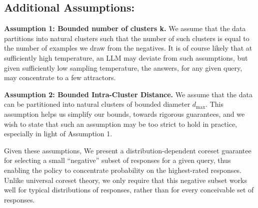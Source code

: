 


\noindent
\subsection{Additional Assumptions:}
\textbf{Assumption 1: Bounded number of clusters k.}  
We assume that the data partitions into natural clusters such that the number of such clusters is equal to the number of examples we draw from the negatives. It is of course likely that at sufficiently high temperature, an LLM may deviate from such assumptions, but given sufficiently low sampling temperature, the answers, for any given query, may concentrate to a few attractors.

\textbf{Assumption 2: Bounded Intra-Cluster Distance.}  
We assume that the data can be partitioned into natural clusters of bounded diameter \(d_{\max}\). This assumption helps us simplify our bounds, towards rigorous guarantees, and we wish to state that such an assumption may be too strict to hold in practice, especially in light of Assumption 1.




Given these assumptions, We present a distribution-dependent coreset guarantee for selecting a small ``negative'' subset of responses for a given query, thus enabling the policy to concentrate probability on the highest-rated responses. Unlike universal coreset theory, we only require that this negative subset works well for typical distributions of responses, rather than for every conceivable set of responses.

